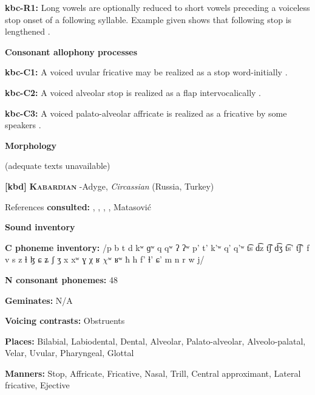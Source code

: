 \textbf{kbc-R1:} Long vowels are optionally reduced to short vowels preceding a voiceless stop onset of a following syllable. Example given shows that following stop is lengthened \citep[17]{Sandalo1997}.



\textbf{Consonant allophony processes}



\textbf{kbc-C1:} A voiced uvular fricative may be realized as a stop word-initially \citep[16]{Sandalo1997}.



\textbf{kbc-C2:} A voiced alveolar stop is realized as a flap intervocalically \citep[16]{Sandalo1997}.



\textbf{kbc-C3:} A voiced palato-alveolar affricate is realized as a fricative by some speakers \citep[15-16]{Sandalo1997}.



\textbf{Morphology}



(adequate texts unavailable)



\textbf{[kbd]}   \textbf{\textsc{Kabardian}}  -Adyge, \textit{Circassian} (Russia, Turkey)



References \textbf{consulted:} \citet{Applebaum2013}, \citet{Colarusso2006}, \citet{GordonApplebaum2010}, \citet{Kuipers1960}, Matasović 



\textbf{Sound inventory}



\textbf{C phoneme inventory:} /p b t d kʷ ɡʷ q qʷ ʔ ʔʷ p’ t’ k’ʷ q’ q’ʷ t͡s d͡z t͡ʃ d͡ʒ t͡s’ t͡ʃ’ f v s z ɬ ɮ ɕ ʑ ʃ ʒ x xʷ ɣ χ ʁ $\chi ʷ$ ʁʷ ħ h f' ɬ’ ɕ' m n r w j/



\textbf{N consonant phonemes:} 48



\textbf{Geminates:} N/A



\textbf{Voicing contrasts:} Obstruents



\textbf{Places:} Bilabial, Labiodental, Dental, Alveolar, Palato-alveolar, Alveolo-palatal, Velar, Uvular, Pharyngeal, Glottal



\textbf{Manners:} Stop, Affricate, Fricative, Nasal, Trill, Central approximant, Lateral fricative, Ejective



